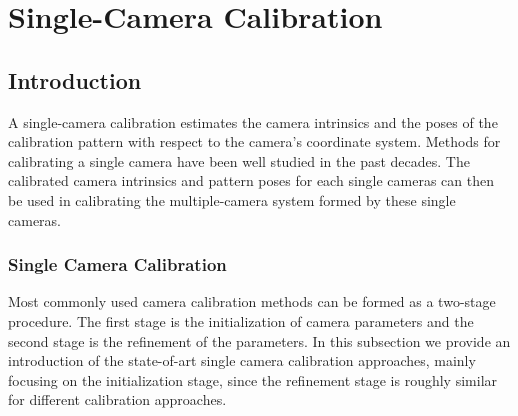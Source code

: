\documentclass{report}
\begin{document}
\chapter{Single-Camera Calibration}
\section{Introduction}

\label{singleSec}
A single-camera calibration estimates the camera intrinsics and the poses of the calibration pattern with respect to the camera's coordinate system. Methods for calibrating a single camera have been well studied in the past decades. The calibrated camera intrinsics and pattern poses for each single cameras can then be used in calibrating the multiple-camera system formed by these single cameras. 



\subsection{Single Camera Calibration}
Most commonly used camera calibration methods can be formed as a two-stage procedure. The first stage is the initialization of camera parameters and the second stage is the refinement of the parameters. In this subsection we provide an introduction of the state-of-art single camera calibration approaches, mainly focusing on the initialization stage, since the refinement stage is roughly similar for different calibration approaches. 
\end{document}
